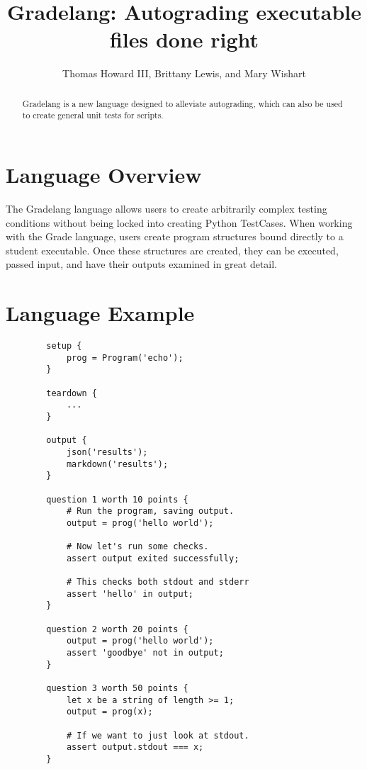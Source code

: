 \documentclass{article}
\title{Gradelang: Autograding executable files done right}
\author{Thomas Howard III, Brittany Lewis, and Mary Wishart}
\begin{document}
    \maketitle

    \begin{abstract}
        Gradelang is a new language designed to alleviate autograding, which can also be used to create general unit tests for scripts.
    \end{abstract}
    
    \section{Language Overview}
    The Gradelang language allows users to create arbitrarily complex testing conditions without being locked into creating Python TestCases.
    When working with the Grade language, users create program structures bound directly to a student executable.
    Once these structures are created, they can be executed, passed input, and have their outputs examined in great detail.
    
      
    \newpage
    \section{Language Example}
    \begin{lstlisting}
        setup {
            prog = Program('echo');
        }

        teardown {
            ...
        }

        output {
            json('results');
            markdown('results');
        }

        question 1 worth 10 points {
            # Run the program, saving output.
            output = prog('hello world');

            # Now let's run some checks.
            assert output exited successfully;
            
            # This checks both stdout and stderr
            assert 'hello' in output;
        }

        question 2 worth 20 points {
            output = prog('hello world');
            assert 'goodbye' not in output;
        }

        question 3 worth 50 points {
            let x be a string of length >= 1;
            output = prog(x);

            # If we want to just look at stdout.
            assert output.stdout === x;
        }
    \end{lstlisting}
\end{document}
